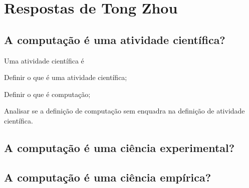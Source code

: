 \section{Respostas de Tong Zhou}

\subsection{A computação é uma atividade científica?}

Uma atividade científica é 

    \item Definir o que é uma atividade científica;
    \item Definir o que é computação;
    \item Analisar se a definição de computação sem enquadra na definição de atividade científica. 

\subsection{A computação é uma ciência experimental?}

\subsection{A computação é uma ciência empírica?}